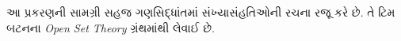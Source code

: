 \documentclass[../../../include/open-logic-section]{subfiles}
\begin{document}

\begin{editorial}
આ પ્રકરણની સામગ્રી સહજ ગણસિદ્ધાંતમાં સંખ્યાસંહતિઓની રચના
રજૂ કરે છે. તે ટિમ બટનના \emph{Open Set Theory} ગ્રંથમાંથી લેવાઈ છે.
\end{editorial}


\OLEndChapterHook
\end{document}
